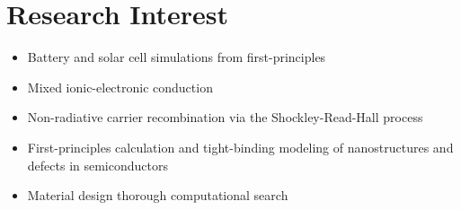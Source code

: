 \section{Research Interest}\label{research-interest}

\begin{itemize}
\tightlist
\item
  Battery and solar cell simulations from first-principles
\item
  Mixed ionic-electronic conduction
\item
  Non-radiative carrier recombination via the Shockley-Read-Hall process
\item
  First-principles calculation and tight-binding modeling of
  nanostructures and defects in semiconductors
\item
  Material design thorough computational search
\end{itemize}
